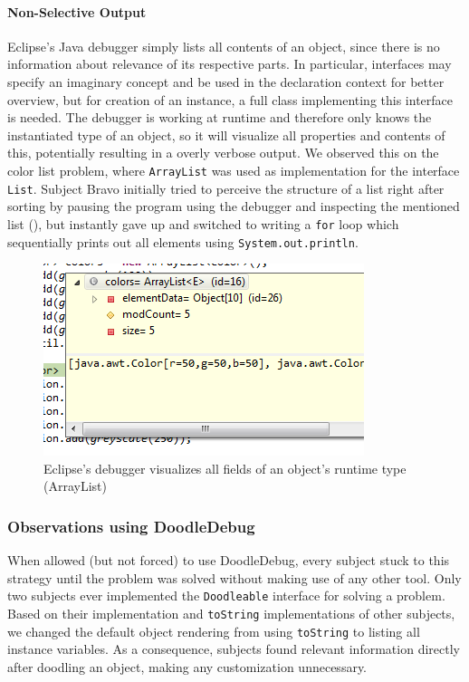 \documentclass[english]{scrartcl}
\newcommand{\DD}{Dood\-le\-De\-bug\xspace}
\newcommand{\println}{\texttt{Sys\-tem.\-out.\-println}\xspace}
\begin{document}
\paragraph{Non-Selective Output}
Eclipse's Java debugger simply lists all contents of an object, since there is no information about relevance of its respective parts.
In particular, interfaces may specify an imaginary concept and be used in the declaration context for better overview, but for creation of an instance, a full class implementing this interface is needed.
The debugger is working at runtime and therefore only knows the instantiated type of an object, so it will visualize all properties and contents of this, potentially resulting in a overly verbose output.
We observed this on the color list problem, where \texttt{ArrayList} was used as implementation for the interface \texttt{List}.
Subject Bravo initially tried to perceive the structure of a list right after sorting by pausing the program  using the debugger and inspecting the mentioned list (), but instantly gave up and switched to writing a \texttt{for} loop which sequentially prints out all elements using \println.

\begin{figure}[h]
	\includegraphics[width=\linewidth]{img/debugger_color-list_remo.png}
	\caption[Bravo using the debugger for a color list]{Eclipse's debugger visualizes all fields of an object's runtime type (ArrayList)}
\end{figure}

\subsubsection{Observations using DoodleDebug}
When allowed (but not forced) to use \DD, every subject stuck to this strategy until the problem was solved without making use of any other tool.
Only two subjects ever implemented the \texttt{Doodleable} interface for solving a problem.
Based on their implementation and \texttt{toString} implementations of other subjects, we changed the default object rendering from using \texttt{toString} to listing all instance variables.
As a consequence, subjects found relevant information directly after doodling an object, making any customization unnecessary.
\end{document}
